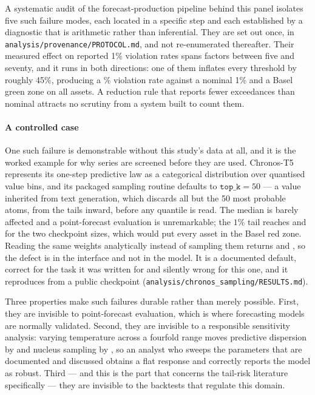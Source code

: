 \documentclass[preprint,11pt,authoryear]{elsarticle}
\newcommand{\1}{\boldsymbol{1}}
\begin{document}
A systematic audit of the forecast-production pipeline behind this panel isolates
five such failure modes, each located in a specific step and each established by
a diagnostic that is arithmetic rather than inferential. They are set out once,
in \texttt{analysis/provenance/PROTOCOL.md}, and not re-enumerated thereafter. Their
measured effect on reported 1\% violation rates spans factors between five and seventy, and it runs in both directions: one of them inflates every threshold by
roughly 45\%, producing a \nRawPiGJRDefectivePct\% violation rate against a nominal 1\% and a Basel
green zone on all \nMainAssets{} assets. A reduction rule that reports fewer
exceedances than nominal attracts no scrutiny from a system built to count them.

\paragraph{A controlled case} One such failure is demonstrable without this
study's data at all, and it is the worked example for why series are screened
before they are used. Chronos-T5 \citep{ansari2024chronos} represents its
one-step predictive law as a categorical distribution over quantised value bins,
and its packaged sampling routine defaults to $\texttt{top\_k} = 50$ --- a value
inherited from text generation, which discards all but the 50 most probable
atoms, from the tails inward, before any quantile is read. The median is barely
affected and a point-forecast evaluation is unremarkable; the $1\%$ tail reaches
\nPiSmallDefaultOne{} and \nPiMiniDefaultOne{} for the two checkpoint sizes,
which would put every asset in the Basel red zone. Reading the same weights
analytically instead of sampling them returns \nPiSmallAnalyticOne{} and
\nPiMiniAnalyticOne, so the defect is in the interface and not in the model. It
is a documented default, correct for the task it was written for and silently
wrong for this one, and it reproduces from a public checkpoint
(\texttt{analysis/chronos\_sampling/RESULTS.md}).

Three properties make such failures durable rather than merely possible. First,
they are invisible to point-forecast evaluation, which is where forecasting
models are normally validated. Second, they are invisible to a responsible
sensitivity analysis: varying temperature across a fourfold range moves predictive dispersion by \nLitTempGap{} and nucleus sampling by \nLitNucleusGap, so an analyst who
sweeps the parameters that are documented and discussed obtains a flat response
and correctly reports the model as robust. Third --- and this is the part that
concerns the tail-risk literature specifically --- they are invisible to the
backtests that regulate this domain.
\end{document}
